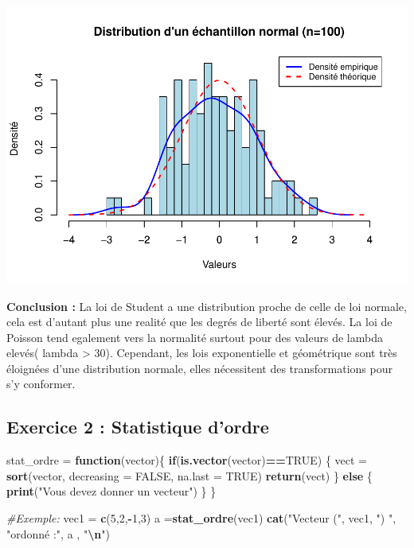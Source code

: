 \documentclass[
  12pt,
]{article}
\newenvironment{Shaded}{\begin{snugshade}}{\end{snugshade}}
\newcommand{\AttributeTok}[1]{\textcolor[rgb]{0.13,0.29,0.53}{#1}}
\newcommand{\CommentTok}[1]{\textcolor[rgb]{0.56,0.35,0.01}{\textit{#1}}}
\newcommand{\ConstantTok}[1]{\textcolor[rgb]{0.56,0.35,0.01}{#1}}
\newcommand{\ControlFlowTok}[1]{\textcolor[rgb]{0.13,0.29,0.53}{\textbf{#1}}}
\newcommand{\DecValTok}[1]{\textcolor[rgb]{0.00,0.00,0.81}{#1}}
\newcommand{\FunctionTok}[1]{\textcolor[rgb]{0.13,0.29,0.53}{\textbf{#1}}}
\newcommand{\NormalTok}[1]{#1}
\newcommand{\OtherTok}[1]{\textcolor[rgb]{0.56,0.35,0.01}{#1}}
\newcommand{\SpecialCharTok}[1]{\textcolor[rgb]{0.81,0.36,0.00}{\textbf{#1}}}
\newcommand{\StringTok}[1]{\textcolor[rgb]{0.31,0.60,0.02}{#1}}
\begin{document}
\includegraphics{Stat_non_para_files/figure-latex/unnamed-chunk-8-1.pdf}

\textbf{Conclusion : } La loi de Student a une distribution proche de
celle de loi normale, cela est d'autant plus une realité que les degrés
de liberté sont élevés. La loi de Poisson tend egalement vers la
normalité surtout pour des valeurs de lambda elevés( lambda
\textgreater{} 30). Cependant, les lois exponentielle et géométrique
sont très éloignées d'une distribution normale, elles nécessitent des
transformations pour s'y conformer.

\subsection{Exercice 2 : Statistique
d'ordre}\label{exercice-2-statistique-dordre}

\begin{Shaded}
\begin{Highlighting}[]
\NormalTok{stat\_ordre }\OtherTok{=} \ControlFlowTok{function}\NormalTok{(vector)\{}
              \ControlFlowTok{if}\NormalTok{(}\FunctionTok{is.vector}\NormalTok{(vector)}\SpecialCharTok{==}\ConstantTok{TRUE}\NormalTok{) \{}
\NormalTok{                vect }\OtherTok{=} \FunctionTok{sort}\NormalTok{(vector, }\AttributeTok{decreasing =} \ConstantTok{FALSE}\NormalTok{, }\AttributeTok{na.last =} \ConstantTok{TRUE}\NormalTok{)}
                \FunctionTok{return}\NormalTok{(vect)}
\NormalTok{              \} }\ControlFlowTok{else}\NormalTok{ \{}
                \FunctionTok{print}\NormalTok{(}\StringTok{"Vous devez donner un vecteur"}\NormalTok{)}
\NormalTok{              \}}
\NormalTok{  \}}

\CommentTok{\#Exemple:}
\NormalTok{vec1 }\OtherTok{=} \FunctionTok{c}\NormalTok{(}\DecValTok{5}\NormalTok{,}\DecValTok{2}\NormalTok{,}\SpecialCharTok{{-}}\DecValTok{1}\NormalTok{,}\DecValTok{3}\NormalTok{) }
\NormalTok{a }\OtherTok{=}\FunctionTok{stat\_ordre}\NormalTok{(vec1)}
\FunctionTok{cat}\NormalTok{(}\StringTok{"Vecteur ("}\NormalTok{, vec1, }\StringTok{") "}\NormalTok{, }\StringTok{"ordonné :"}\NormalTok{, a , }\StringTok{"}\SpecialCharTok{\textbackslash{}n}\StringTok{"}\NormalTok{)}
\end{Highlighting}
\end{Shaded}
\end{document}
